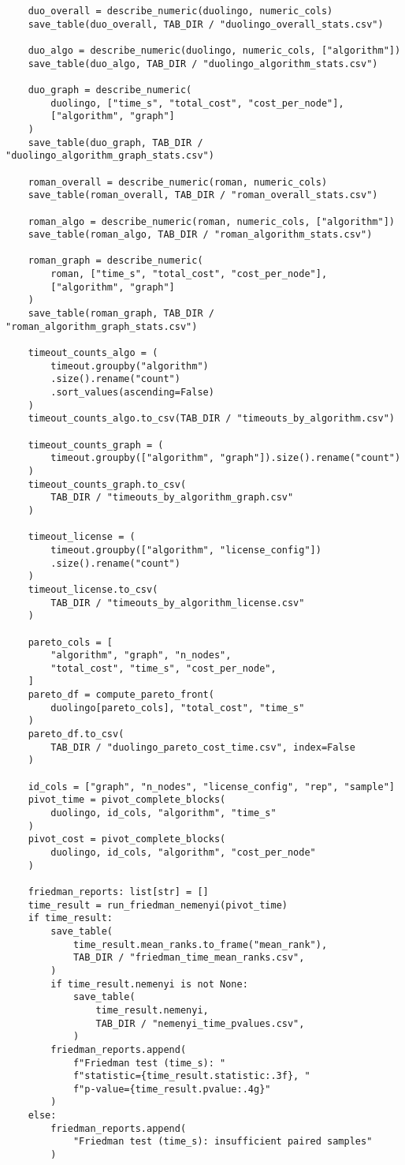\begin{verbatim}
    duo_overall = describe_numeric(duolingo, numeric_cols)
    save_table(duo_overall, TAB_DIR / "duolingo_overall_stats.csv")

    duo_algo = describe_numeric(duolingo, numeric_cols, ["algorithm"])
    save_table(duo_algo, TAB_DIR / "duolingo_algorithm_stats.csv")

    duo_graph = describe_numeric(
        duolingo, ["time_s", "total_cost", "cost_per_node"],
        ["algorithm", "graph"]
    )
    save_table(duo_graph, TAB_DIR / "duolingo_algorithm_graph_stats.csv")

    roman_overall = describe_numeric(roman, numeric_cols)
    save_table(roman_overall, TAB_DIR / "roman_overall_stats.csv")

    roman_algo = describe_numeric(roman, numeric_cols, ["algorithm"])
    save_table(roman_algo, TAB_DIR / "roman_algorithm_stats.csv")

    roman_graph = describe_numeric(
        roman, ["time_s", "total_cost", "cost_per_node"],
        ["algorithm", "graph"]
    )
    save_table(roman_graph, TAB_DIR / "roman_algorithm_graph_stats.csv")

    timeout_counts_algo = (
        timeout.groupby("algorithm")
        .size().rename("count")
        .sort_values(ascending=False)
    )
    timeout_counts_algo.to_csv(TAB_DIR / "timeouts_by_algorithm.csv")

    timeout_counts_graph = (
        timeout.groupby(["algorithm", "graph"]).size().rename("count")
    )
    timeout_counts_graph.to_csv(
        TAB_DIR / "timeouts_by_algorithm_graph.csv"
    )

    timeout_license = (
        timeout.groupby(["algorithm", "license_config"])
        .size().rename("count")
    )
    timeout_license.to_csv(
        TAB_DIR / "timeouts_by_algorithm_license.csv"
    )

    pareto_cols = [
        "algorithm", "graph", "n_nodes",
        "total_cost", "time_s", "cost_per_node",
    ]
    pareto_df = compute_pareto_front(
        duolingo[pareto_cols], "total_cost", "time_s"
    )
    pareto_df.to_csv(
        TAB_DIR / "duolingo_pareto_cost_time.csv", index=False
    )

    id_cols = ["graph", "n_nodes", "license_config", "rep", "sample"]
    pivot_time = pivot_complete_blocks(
        duolingo, id_cols, "algorithm", "time_s"
    )
    pivot_cost = pivot_complete_blocks(
        duolingo, id_cols, "algorithm", "cost_per_node"
    )

    friedman_reports: list[str] = []
    time_result = run_friedman_nemenyi(pivot_time)
    if time_result:
        save_table(
            time_result.mean_ranks.to_frame("mean_rank"),
            TAB_DIR / "friedman_time_mean_ranks.csv",
        )
        if time_result.nemenyi is not None:
            save_table(
                time_result.nemenyi,
                TAB_DIR / "nemenyi_time_pvalues.csv",
            )
        friedman_reports.append(
            f"Friedman test (time_s): "
            f"statistic={time_result.statistic:.3f}, "
            f"p-value={time_result.pvalue:.4g}"
        )
    else:
        friedman_reports.append(
            "Friedman test (time_s): insufficient paired samples"
        )


\end{verbatim}
